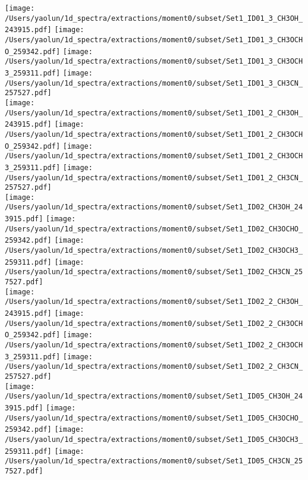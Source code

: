 \renewcommand{\thefigure}{\arabic{figure} (Cont.)}
\addtocounter{figure}{-1}
\begin{figure*}[htbp!]
  \centering
  \texttt{[image: /Users/yaolun/1d\_spectra/extractions/moment0/subset/Set1\_ID01\_3\_CH3OH\_243915.pdf]}
  \texttt{[image: /Users/yaolun/1d\_spectra/extractions/moment0/subset/Set1\_ID01\_3\_CH3OCHO\_259342.pdf]}
  \texttt{[image: /Users/yaolun/1d\_spectra/extractions/moment0/subset/Set1\_ID01\_3\_CH3OCH3\_259311.pdf]}
  \texttt{[image: /Users/yaolun/1d\_spectra/extractions/moment0/subset/Set1\_ID01\_3\_CH3CN\_257527.pdf]}
  \\
  \texttt{[image: /Users/yaolun/1d\_spectra/extractions/moment0/subset/Set1\_ID01\_2\_CH3OH\_243915.pdf]}
  \texttt{[image: /Users/yaolun/1d\_spectra/extractions/moment0/subset/Set1\_ID01\_2\_CH3OCHO\_259342.pdf]}
  \texttt{[image: /Users/yaolun/1d\_spectra/extractions/moment0/subset/Set1\_ID01\_2\_CH3OCH3\_259311.pdf]}
  \texttt{[image: /Users/yaolun/1d\_spectra/extractions/moment0/subset/Set1\_ID01\_2\_CH3CN\_257527.pdf]}
  \\
  \texttt{[image: /Users/yaolun/1d\_spectra/extractions/moment0/subset/Set1\_ID02\_CH3OH\_243915.pdf]}
  \texttt{[image: /Users/yaolun/1d\_spectra/extractions/moment0/subset/Set1\_ID02\_CH3OCHO\_259342.pdf]}
  \texttt{[image: /Users/yaolun/1d\_spectra/extractions/moment0/subset/Set1\_ID02\_CH3OCH3\_259311.pdf]}
  \texttt{[image: /Users/yaolun/1d\_spectra/extractions/moment0/subset/Set1\_ID02\_CH3CN\_257527.pdf]}
  \\
  \texttt{[image: /Users/yaolun/1d\_spectra/extractions/moment0/subset/Set1\_ID02\_2\_CH3OH\_243915.pdf]}
  \texttt{[image: /Users/yaolun/1d\_spectra/extractions/moment0/subset/Set1\_ID02\_2\_CH3OCHO\_259342.pdf]}
  \texttt{[image: /Users/yaolun/1d\_spectra/extractions/moment0/subset/Set1\_ID02\_2\_CH3OCH3\_259311.pdf]}
  \texttt{[image: /Users/yaolun/1d\_spectra/extractions/moment0/subset/Set1\_ID02\_2\_CH3CN\_257527.pdf]}
  \\
  \texttt{[image: /Users/yaolun/1d\_spectra/extractions/moment0/subset/Set1\_ID05\_CH3OH\_243915.pdf]}
  \texttt{[image: /Users/yaolun/1d\_spectra/extractions/moment0/subset/Set1\_ID05\_CH3OCHO\_259342.pdf]}
  \texttt{[image: /Users/yaolun/1d\_spectra/extractions/moment0/subset/Set1\_ID05\_CH3OCH3\_259311.pdf]}
  \texttt{[image: /Users/yaolun/1d\_spectra/extractions/moment0/subset/Set1\_ID05\_CH3CN\_257527.pdf]}
  \\
  \caption{}
\end{figure*}
